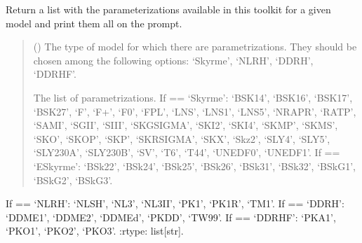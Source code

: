 \documentclass[letterpaper,10pt,english]{sphinxmanual}
\begin{document}
\begin{fulllineitems}
\label{\detokenize{source/api/setup_eos_pheno:nucleardatapy.eos.setup_pheno.pheno_params}}
\pysigstartsignatures
{}
\pysigstopsignatures
\sphinxAtStartPar
Return a list with the parameterizations available in
this toolkit for a given model and print them all on the prompt.
\begin{quote}\begin{description}
\sphinxAtStartPar
{} () \textendash{} The type of model for which there are parametrizations.     They should be chosen among the following options: ‘Skyrme’, ‘NLRH’,     ‘DDRH’, ‘DDRHF’.

\sphinxAtStartPar
The list of parametrizations.     If  == ‘Skyrme’: ‘BSK14’,     ‘BSK16’, ‘BSK17’, ‘BSK27’, ‘F\sphinxhyphen{}’, ‘F+’, ‘F0’, ‘FPL’, ‘LNS’, ‘LNS1’, ‘LNS5’,     ‘NRAPR’, ‘RATP’, ‘SAMI’, ‘SGII’, ‘SIII’, ‘SKGSIGMA’, ‘SKI2’, ‘SKI4’, ‘SKMP’,     ‘SKMS’, ‘SKO’, ‘SKOP’, ‘SKP’, ‘SKRSIGMA’, ‘SKX’, ‘Skz2’, ‘SLY4’, ‘SLY5’,     ‘SLY230A’, ‘SLY230B’, ‘SV’, ‘T6’, ‘T44’, ‘UNEDF0’, ‘UNEDF1’.     If  == ‘ESkyrme’: ‘BSk22’, ‘BSk24’, ‘BSk25’, ‘BSk26’, ‘BSk31’, ‘BSk32’,     ‘BSkG1’, ‘BSkG2’, ‘BSkG3’.

\end{description}\end{quote}

\sphinxAtStartPar
If  == ‘NLRH’: ‘NL\sphinxhyphen{}SH’, ‘NL3’, ‘NL3II’, ‘PK1’, ‘PK1R’, ‘TM1’.     If  == ‘DDRH’: ‘DDME1’, ‘DDME2’, ‘DDMEd’, ‘PKDD’, ‘TW99’.     If  == ‘DDRHF’: ‘PKA1’, ‘PKO1’, ‘PKO2’, ‘PKO3’.
:rtype: list{[}str{]}.

\end{fulllineitems}

\end{document}
